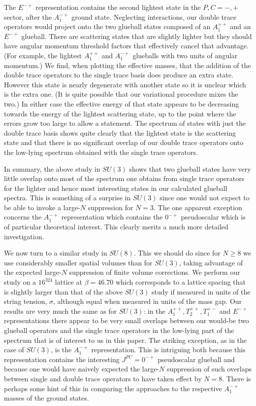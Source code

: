 \documentclass[12pt]{article}
\begin{document}
The $E^{-+}$ representation contains the second lightest state in the $P,C=-,+$
sector, after the $A_1^{-+}$  ground state. Neglecting interactions, our double trace
operators would project onto the two glueball states composed of an $A_1^{++}$ and
an $E^{-+}$ glueball. There are scattering states that are slightly lighter
but they should have angular momentum threshold factors that effectively
cancel that advantage. (For example, the lightest  $A_1^{++}$ and $A_1^{-+}$
glueballs with two units of angular momentum.)
We find, when plotting the effective masses,
that the addition of the double trace operators to the single trace basis does
produce an extra state. However this state is nearly degenerate with another state
so it is unclear which is the extra one. (It is quite possible that our variational
procedure mixes the two.) In either case the effective energy of that state appears
to be decreasing towards the energy of the lightest scattering state, up to the
point where the errors grow too large to allow a statement. The spectrum of
states with just the double trace basis
shows quite clearly that the lightest state is the scattering state and that there
is no significant overlap of our double trace operators onto the low-lying spectrum
obtained with the single trace operators.

In summary, the above study in $SU(3)$ shows that two glueball states have very little
overlap onto most of the spectrum one obtains from single trace operators for the
lighter and hence most interesting states in our calculated glueball spectra. This is
something of a surprise in $SU(3)$ since one would not expect to be able to
invoke a large-$N$ suppression for $N=3$. The one apparent exception concerns
the $A_1^{-+}$ representation which contains the $0^{-+}$ pseudoscalar which
is of particular theoretical interest. This clearly merits a much more detailed
investigation.

We now turn to a similar study in $SU(8)$. This we should do since for $N\geq 8$
we use considerably smaller spatial volumes than for $SU(3)$, taking advantage of the
expected large-$N$ suppression of finite volume corrections. We perform our study on
a $16^324$ lattice at $\beta=46.70$ which corresponds to a lattice spacing that
is slightly larger than that of the above $SU(3)$ study if measured in units of the
string tension, $\sigma$, although equal when measured in units of the mass gap.
Our results are very much the same as for  $SU(3)$:
in the $A_1^{++},T_2^{++},T_1^{+-}$ and $E^{-+}$ representations there appear to
be very small overlaps between our would-be two glueball operators and the
single trace operators in the low-lying part of the spectrum that is of interest
to us in this paper. The striking exception, as in the case of $SU(3)$, is the 
$A_1^{-+}$ representation. This is intriguing both because this representation
contains the interesting $J^{PC}=0^{-+}$ pseudoscalar glueball and because one
would have naively expected the large-$N$ suppression of such overlaps between
single and double trace operators to have taken effect by $N=8$. There is
perhaps some hint of this in comparing the approaches to the respective $A_1^{-+}$ masses
of the ground states.
\end{document}
